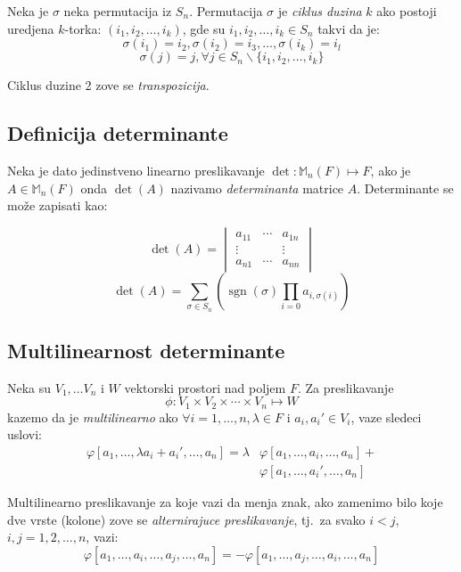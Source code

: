 \documentclass[12p,a4paper]{article}
\DeclareMathOperator{\sgn}{sgn}
\begin{document}
\begin{multicols}{2}
    Neka je $\sigma$ neka permutacija iz $S_n$. Permutacija $\sigma$ je 
    \textit{ciklus duzina} $k$ ako postoji uredjena $k$-torka:
    $(i_1, i_2, \ldots, i_k)$, gde su $i_1, i_2, \ldots, i_k \in S_n$ 
    takvi da je:
    \[\sigma(i_1) = i_2, \sigma(i_2) = i_3, \ldots, \sigma(i_k) = i_l\]
    \[\sigma(j) = j, \forall j \in S_n \backslash \{i_1, i_2, \ldots, i_k\}\]
    
    Ciklus duzine 2 zove se \textit{transpozicija}.

\subsection{Definicija determinante}

    Neka je dato jedinstveno linearno preslikavanje 
    $\det : \mathbb{M}_n (F) \mapsto F$, ako je $A \in \mathbb{M}_n(F)$ onda 
    $\det(A)$ nazivamo \textit{determinanta} matrice $A$. Determinante se 
    može zapisati kao:

    \[
        \det(A) = 
        \begin{vmatrix}
            a_{11} & \cdots & a_{1n} \\
            \vdots & &        \vdots \\
            a_{n1} & \cdots & a_{nn} 
        \end{vmatrix}
    \]
    \[ 
        \det(A) = \sum_{\sigma \in S_n} 
        \left( 
        \sgn(\sigma) \prod_{i=0} a_{i,\sigma(i)} 
        \right) 
    \]

\subsection{Multilinearnost determinante}

    Neka su $V_1, \ldots V_n$ i $W$ vektorski prostori nad poljem $F$. 
    Za preslikavanje 
    \[\phi : V_1 \times V_2 \times \cdots \times V_n \mapsto W\]
    kazemo da je \textit{multilinearno} ako $\forall i=1,\ldots,n, 
    \lambda \in F$ i $a_i, a_i' \in V_i$,
    vaze sledeci uslovi:
    \begin{align*}
        \varphi [ a_1, \ldots, \lambda a_i + a_i', \ldots, a_n ] = 
        \lambda & \varphi [ a_1, \ldots, a_i, \ldots, a_n ] + \\
        &\varphi [ a_1, \ldots, a_i', \ldots, a_n ]
    \end{align*}

    Multilinearno preslikavanje za koje vazi da menja znak, ako 
    zamenimo bilo koje dve vrste (kolone) zove se 
    \textit{alternirajuce preslikavanje}, tj.\ za svako 
    $i < j$, $i, j = 1, 2, \ldots, n$, vazi:
    \[
        \varphi [ a_1, \ldots, a_i, \ldots, a_j, \ldots, a_n ] =
        - \varphi [ a_1, \ldots, a_j, \ldots, a_i, \ldots, a_n ]
    \]


\end{multicols}
\end{document}
